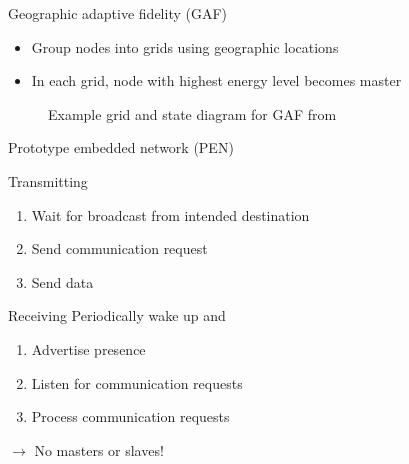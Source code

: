 \documentclass{beamer}
\begin{document}
\begin{frame}{Geographic adaptive fidelity (GAF)\cite{xu2001geography}}
    \begin{itemize}
        \item Group nodes into grids using geographic locations
        \item In each grid, node with highest energy level becomes master

    \end{itemize}
\label{gaf}
\begin{figure}[!t]
\hfill
{}
\caption{Example grid and state diagram for GAF from \cite{alotaibi2012survey}}
\end{figure}
\end{frame}

\begin{frame}{Prototype embedded network (PEN)\cite{girling2000design}}

    \begin{block}{Transmitting}
    \begin{enumerate}
        \item Wait for broadcast from intended destination
        \item Send communication request
        \item Send data
    \end{enumerate}
    \end{block}
    \begin{block}{Receiving}
    Periodically wake up and
    \begin{enumerate}
        \item Advertise presence
        \item Listen for communication requests
        \item Process communication requests
    \end{enumerate}
    \end{block}
$\rightarrow$ No masters or slaves!
\end{frame}
\end{document}
